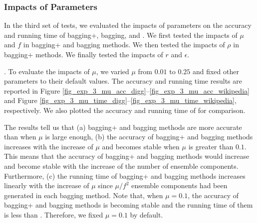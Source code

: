 \subsubsection{Impacts of Parameters}
In the third set of tests, we evaluated the impacts of parameters on
the accuracy and running time of bagging+, bagging, \NMF
and \BIGCLAM. We first tested the impacts of $\mu$ and $f$ in bagging+ and bagging methods.
We then tested the impacts of $\rho$ in bagging+ methods. We finally
tested the impacts of $r$ and $\epsilon$.


. To evaluate the impacts of $\mu$, we
varied $\mu$ from $0.01$ to $0.25$ and fixed other parameters to their
default values. The accuracy and running time results are reported in
Figure \ref{fig_exp_3_mu_acc_digg}--\ref{fig_exp_3_mu_acc_wikipedia} and Figure \ref{fig_exp_3_mu_time_digg}--\ref{fig_exp_3_mu_time_wikipedia},
respectively. We also plotted the accuracy and running time of \NMF for comparison.



The results tell us that (a) bagging+ and bagging methods are more accurate than
\NMF when $\mu$ is large enough, (b) the accuracy of bagging+ and bagging methods
increases with the increase of $\mu$ and becomes stable when $\mu$ is greater
than $0.1$. This means that the accuracy of bagging+ and bagging methods would
increase and become stable with the increase of the number of ensemble components.
Furthermore, (c) the running time of bagging+ and bagging methods increases linearly
with the increase of $\mu$ since $\mu / f^2$ ensemble components had been generated in each bagging
method. Note that, when $\mu = 0.1$, the accuracy of bagging+ and bagging methods
is becoming stable and the running time of them is less than \NMF.
Therefore, we fixed $\mu = 0.1$ by default.






